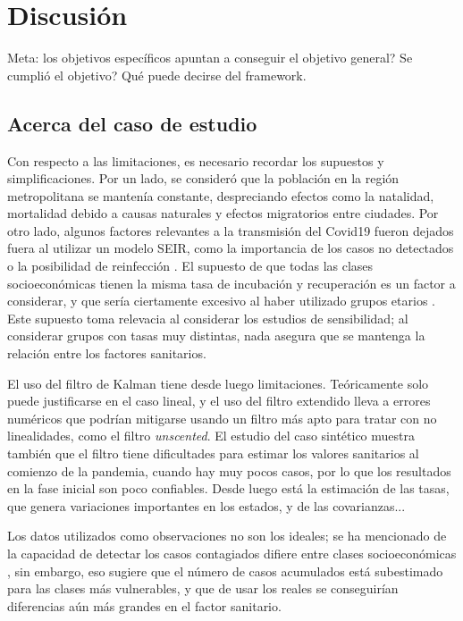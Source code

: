 \chapter{Discusión} \label{chap:discus}

Meta: los objetivos específicos apuntan a conseguir el objetivo general? Se cumplió el objetivo? Qué puede decirse del framework.

\section{Acerca del caso de estudio}

Con respecto a las limitaciones, es necesario recordar los supuestos y simplificaciones. Por un lado, se consideró que la población en la región metropolitana se mantenía constante, despreciando efectos como la natalidad, mortalidad debido a causas naturales y efectos migratorios entre ciudades. Por otro lado, algunos factores relevantes a la transmisión del Covid19 fueron dejados fuera al utilizar un modelo SEIR, como la importancia de los casos no detectados \cite{Li2020c} o la posibilidad de reinfección \cite{}. El supuesto de que todas las clases socioeconómicas tienen la misma tasa de incubación y recuperación es un factor a considerar, y que sería ciertamente excesivo al haber utilizado grupos etarios \cite{}. Este supuesto toma relevacia al considerar los estudios de sensibilidad; al considerar grupos con tasas muy distintas, nada asegura que se mantenga la relación entre los factores sanitarios.

El uso del filtro de Kalman tiene desde luego limitaciones. Teóricamente solo puede justificarse en el caso lineal, y el uso del filtro extendido lleva a errores numéricos que podrían mitigarse usando un filtro más apto para tratar con no linealidades, como el filtro \textit{unscented}. El estudio del caso sintético muestra también que el filtro tiene dificultades para estimar los valores sanitarios al comienzo de la pandemia, cuando hay muy pocos casos, por lo que los resultados en la fase inicial son poco confiables. Desde luego está la estimación de las tasas, que genera variaciones importantes en los estados, y de las covarianzas... 

Los datos utilizados como observaciones no son los ideales; se ha mencionado de la capacidad de detectar los casos contagiados difiere entre clases socioeconómicas \cite{Mena2021}, sin embargo, eso sugiere que el número de casos acumulados está subestimado para las clases más vulnerables, y que de usar los reales se conseguirían diferencias aún más grandes en el factor sanitario.

